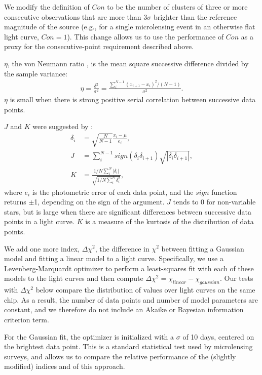 \documentclass{emulateapj}
\begin{document}
We modify the definition of $Con$ to be the number of clusters of three or more consecutive observations that are more than $3\sigma$ brighter than the reference magnitude of the source (e.g., for a single microlensing event in an otherwise flat light curve, $Con=1$). This change allows us to use the performance of $Con$ as a proxy for the consecutive-point requirement described above. 

$\eta$, the von Neumann ratio \citep[also known as the Durbin-Watson statistic;][]{von_neumann1941, durbin50}, is the mean square successive difference divided by the sample variance:
\begin{align}
	\eta = \frac{\delta^2}{\sigma^2} = \frac{\sum^{N-1}_i(x_{i+1} - x_i)^2/(N-1)}{\sigma^2}.
\end{align}
$\eta$ is small when there is strong positive serial correlation between successive data points. 

$J$ and $K$ were suggested by \cite{stetson1996}:
\begin{align}
	\delta_i &= \sqrt{\frac{N}{N-1}}\frac{x_i-\mu}{e_i},\\
	J &= \sum^{N-1}_i sign(\delta_i \delta_{i+1})\sqrt{|\delta_i \delta_{i+1}|},\\
	K &= \frac{1/N\sum^N_i |\delta_i|}{\sqrt{1/N\sum^N_i\delta_i^2}},
\end{align}
where $e_i$ is the photometric error of each data point, and the $sign$ function returns $\pm$1, depending on the sign of the argument. $J$ tends to 0 for non-variable stars, but is large when there are significant differences between successive data points in a light curve. $K$ is a measure of the kurtosis of the distribution of data points.

We add one more index, $\Delta \chi^2$, the difference in $\chi^2$ between fitting a Gaussian model and fitting a linear model to a light curve. Specifically, we use a Levenberg-Marquardt optimizer to perform a least-squares fit with each of these models to the light curves and then compute $\Delta\chi^2=\chi_{linear} - \chi_{gaussian}$. Our tests with $\Delta \chi^2$ below compare the distribution of values over light curves on the same chip. As a result, the number of data points and number of model parameters are constant, and we therefore do not include an Akaike or Bayesian information criterion term. 

For the Gaussian fit, the optimizer is initialized with a $\sigma$ of 10 days, centered on the brightest data point. This is a standard statistical test used by microlensing surveys, and allows us to compare the relative performance of the (slightly modified) \cite{shin2009} indices and of this approach. 
\end{document}
